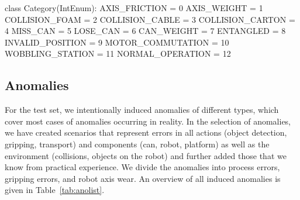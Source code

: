 \documentclass[journal]{IEEEtran}
\begin{document}
class Category(IntEnum):
AXIS_FRICTION = 0
AXIS_WEIGHT = 1
COLLISION_FOAM = 2
COLLISION_CABLE = 3
COLLISION_CARTON = 4
MISS_CAN = 5
LOSE_CAN = 6
CAN_WEIGHT = 7
ENTANGLED = 8
INVALID_POSITION = 9
MOTOR_COMMUTATION = 10
WOBBLING_STATION = 11
NORMAL_OPERATION = 12
\fi

\begin{table}
\centering
{}
\caption{List of anomaly types grouped in their cause. The listed variants are labeled in the dataset.}
\label{tab:anolist}
    \vspace{-5mm}
\end{table}

\subsection{Anomalies}
\label{anomalies}
For the test set, we intentionally induced anomalies of different types, which cover most cases of anomalies occurring in reality.
{In the selection of anomalies, we have created scenarios that represent errors in all actions (object detection, gripping, transport) and components (can, robot, platform) as well as the environment (collisions, objects on the robot) and further added those that we know from practical experience.}
We divide the anomalies into process errors, gripping errors, and robot axis wear.
An overview of all induced anomalies is given in Table~\ref{tab:anolist}.
\end{document}
